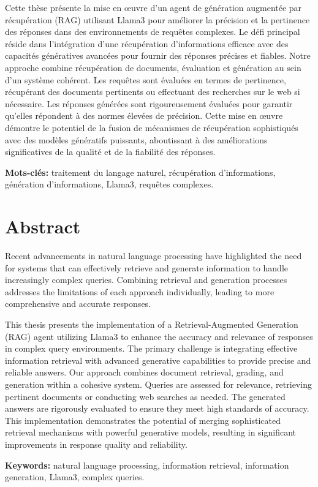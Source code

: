 Cette thèse présente la mise en œuvre d'un agent de génération augmentée par récupération (RAG) utilisant Llama3 pour améliorer la précision et la pertinence des réponses dans des environnements de requêtes complexes. Le défi principal réside dans l'intégration d'une récupération d'informations efficace avec des capacités génératives avancées pour fournir des réponses précises et fiables. Notre approche combine récupération de documents, évaluation et génération au sein d'un système cohérent. Les requêtes sont évaluées en termes de pertinence, récupérant des documents pertinents ou effectuant des recherches sur le web si nécessaire. Les réponses générées sont rigoureusement évaluées pour garantir qu'elles répondent à des normes élevées de précision. Cette mise en œuvre démontre le potentiel de la fusion de mécanismes de récupération sophistiqués avec des modèles génératifs puissants, aboutissant à des améliorations significatives de la qualité et de la fiabilité des réponses.

\hfill

\noindent\textbf{Mots-clés:} traitement du langage naturel, récupération d'informations, génération d'informations, Llama3, requêtes complexes.


\chapter*{Abstract}

Recent advancements in natural language processing have highlighted the need for systems that can effectively retrieve and generate information to handle increasingly complex queries. Combining retrieval and generation processes addresses the limitations of each approach individually, leading to more comprehensive and accurate responses.

\hfill

This thesis presents the implementation of a Retrieval-Augmented Generation (RAG) agent utilizing Llama3 to enhance the accuracy and relevance of responses in complex query environments. The primary challenge is integrating effective information retrieval with advanced generative capabilities to provide precise and reliable answers. Our approach combines document retrieval, grading, and generation within a cohesive system. Queries are assessed for relevance, retrieving pertinent documents or conducting web searches as needed. The generated answers are rigorously evaluated to ensure they meet high standards of accuracy. This implementation demonstrates the potential of merging sophisticated retrieval mechanisms with powerful generative models, resulting in significant improvements in response quality and reliability.

\hfill

\noindent\textbf{Keywords:} natural language processing, information retrieval, information generation, Llama3, complex queries.